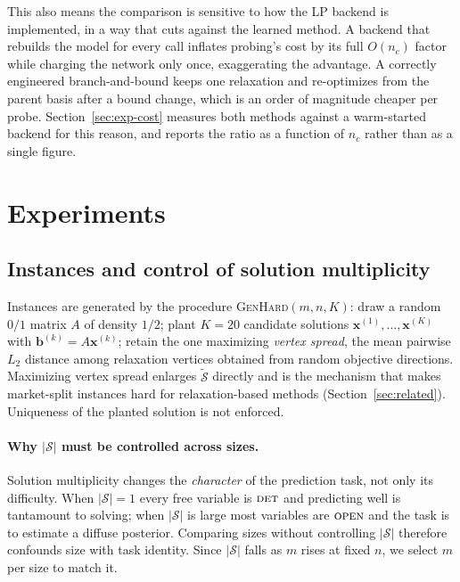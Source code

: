 \documentclass[11pt]{article}
\newcommand{\SOL}{\mathcal{S}}
\newcommand{\FORCED}{\textsc{det}}
\newcommand{\FREE}{\textsc{open}}
\begin{document}
This also means the comparison is sensitive to how the LP backend is implemented, in a way that cuts against the learned method. A backend that rebuilds the model for every call inflates probing's cost by its full $O(n_c)$ factor while charging the network only once, exaggerating the advantage. A correctly engineered branch-and-bound keeps one relaxation and re-optimizes from the parent basis after a bound change, which is an order of magnitude cheaper per probe. Section~\ref{sec:exp-cost} measures both methods against a warm-started backend for this reason, and reports the ratio as a function of $n_c$ rather than as a single figure.

\section{Experiments}
\label{sec:exp}

\subsection{Instances and control of solution multiplicity}
\label{sec:exp-instances}

Instances are generated by the procedure \textsc{GenHard}$(m,n,K)$: draw a random $0/1$ matrix $A$ of density $1/2$; plant $K=20$ candidate solutions $\mathbf{x}^{(1)},\dots,\mathbf{x}^{(K)}$ with $\mathbf{b}^{(k)}=A\mathbf{x}^{(k)}$; retain the one maximizing \emph{vertex spread}, the mean pairwise $L_2$ distance among relaxation vertices obtained from random objective directions. Maximizing vertex spread enlarges $\tilde{\SOL}$ directly and is the mechanism that makes market-split instances hard for relaxation-based methods (Section~\ref{sec:related}). Uniqueness of the planted solution is not enforced.

\paragraph{Why $|\SOL|$ must be controlled across sizes.} Solution multiplicity changes the \emph{character} of the prediction task, not only its difficulty. When $|\SOL|=1$ every free variable is $\FORCED$ and predicting well is tantamount to solving; when $|\SOL|$ is large most variables are $\FREE$ and the task is to estimate a diffuse posterior. Comparing sizes without controlling $|\SOL|$ therefore confounds size with task identity. Since $|\SOL|$ falls as $m$ rises at fixed $n$, we select $m$ per size to match it.
\end{document}
